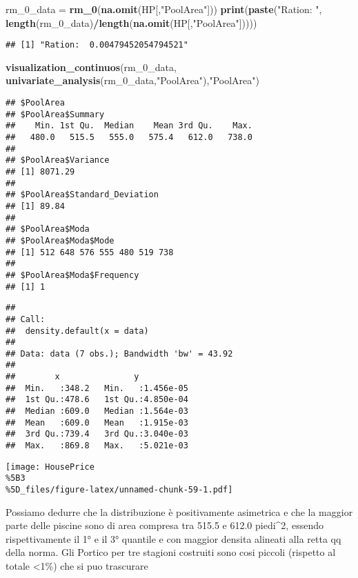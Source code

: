 \documentclass[
]{article}
\newenvironment{Shaded}{\begin{snugshade}}{\end{snugshade}}
\newcommand{\FunctionTok}[1]{\textcolor[rgb]{0.13,0.29,0.53}{\textbf{#1}}}
\newcommand{\NormalTok}[1]{#1}
\newcommand{\OtherTok}[1]{\textcolor[rgb]{0.56,0.35,0.01}{#1}}
\newcommand{\SpecialCharTok}[1]{\textcolor[rgb]{0.81,0.36,0.00}{\textbf{#1}}}
\newcommand{\StringTok}[1]{\textcolor[rgb]{0.31,0.60,0.02}{#1}}
\begin{document}
\begin{Shaded}
\begin{Highlighting}[]
\NormalTok{rm\_0\_data }\OtherTok{=} \FunctionTok{rm\_0}\NormalTok{(}\FunctionTok{na.omit}\NormalTok{(HP[,}\StringTok{"PoolArea"}\NormalTok{]))}
\FunctionTok{print}\NormalTok{(}\FunctionTok{paste}\NormalTok{(}\StringTok{"Ration: "}\NormalTok{, }\FunctionTok{length}\NormalTok{(rm\_0\_data)}\SpecialCharTok{/}\FunctionTok{length}\NormalTok{(}\FunctionTok{na.omit}\NormalTok{(HP[,}\StringTok{"PoolArea"}\NormalTok{]))))}
\end{Highlighting}
\end{Shaded}

\begin{verbatim}
## [1] "Ration:  0.00479452054794521"
\end{verbatim}

\begin{Shaded}
\begin{Highlighting}[]
\FunctionTok{visualization\_continuos}\NormalTok{(rm\_0\_data, }\FunctionTok{univariate\_analysis}\NormalTok{(rm\_0\_data,}\StringTok{"PoolArea"}\NormalTok{),}\StringTok{"PoolArea"}\NormalTok{)}
\end{Highlighting}
\end{Shaded}

\begin{verbatim}
## $PoolArea
## $PoolArea$Summary
##    Min. 1st Qu.  Median    Mean 3rd Qu.    Max. 
##   480.0   515.5   555.0   575.4   612.0   738.0 
## 
## $PoolArea$Variance
## [1] 8071.29
## 
## $PoolArea$Standard_Deviation
## [1] 89.84
## 
## $PoolArea$Moda
## $PoolArea$Moda$Mode
## [1] 512 648 576 555 480 519 738
## 
## $PoolArea$Moda$Frequency
## [1] 1
\end{verbatim}

\begin{verbatim}
## 
## Call:
##  density.default(x = data)
## 
## Data: data (7 obs.); Bandwidth 'bw' = 43.92
## 
##        x               y            
##  Min.   :348.2   Min.   :1.456e-05  
##  1st Qu.:478.6   1st Qu.:4.850e-04  
##  Median :609.0   Median :1.564e-03  
##  Mean   :609.0   Mean   :1.915e-03  
##  3rd Qu.:739.4   3rd Qu.:3.040e-03  
##  Max.   :869.8   Max.   :5.021e-03
\end{verbatim}

\texttt{[image: HousePrice\\\%5B3\\\%5D\_files/figure-latex/unnamed-chunk-59-1.pdf]}

Possiamo dedurre che la distribuzione è positivamente asimetrica e che
la maggior parte delle piscine sono di area compresa tra 515.5 e 612.0
piedi\^{}2, essendo rispettivamente il 1° e il 3° quantile e con maggior
densita alineati alla retta qq della norma. Gli Portico per tre stagioni
costruiti sono cosi piccoli (rispetto al totale \textless1\%) che si puo
trascurare
\end{document}
